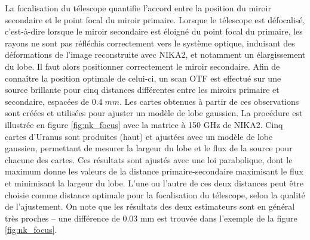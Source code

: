 La focalisation du télescope quantifie l'accord entre la position du miroir secondaire et le point focal du miroir primaire.
Lorsque le télescope est défocalisé, c'est-à-dire lorsque le miroir secondaire est éloigné du point focal du primaire, les rayons ne sont pas réfléchis correctement vers le système optique, induisant des déformations de l'image reconstruite avec NIKA2, et notamment un élargissement du lobe.
Il faut alors positionner correctement le miroir secondaire.
Afin de connaître la position optimale de celui-ci, un scan OTF est effectué sur une source brillante pour cinq distances différentes entre les miroirs primaire et secondaire, espacées de $0.4 \;\unit{mm}$.
Les cartes obtenues à partir de ces observations sont créées et utilisées pour ajuster un modèle de lobe gaussien.
La procédure est illustrée en figure \ref{fig:nk_focus} avec la matrice à 150 GHz de NIKA2.
Cinq cartes d'Uranus sont produites (haut) et ajustées avec un modèle de lobe gaussien, permettant de mesurer la largeur du lobe et le flux de la source pour chacune des cartes.
Ces résultats sont ajustés avec une loi parabolique, dont le maximum donne les valeurs de la distance primaire-secondaire maximisant le flux et minimisant la largeur du lobe.
L'une ou l'autre de ces deux distances peut être choisie comme distance optimale pour la focalisation du télescope, selon la qualité de l'ajustement.
On note que les résultats des deux estimateurs sont en général très proches -- une différence de 0.03 mm est trouvée dans l'exemple de la figure \ref{fig:nk_focus}.

